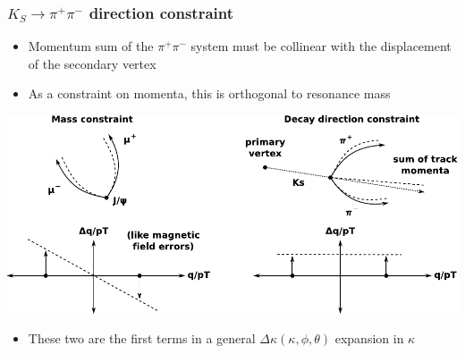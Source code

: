 \documentclass[compress]{beamer}
\begin{document}
\begin{frame}
\frametitle{$K_S \to \pi^+\pi^-$ direction constraint}

\begin{itemize}
\item Momentum sum of the $\pi^+\pi^-$ system must be collinear with
  the displacement of the secondary vertex

\item As a constraint on momenta, this is orthogonal to resonance mass
\end{itemize}

\includegraphics[width=\linewidth]{diagram.pdf}

\begin{itemize}
\item These two are the first terms in a general $\Delta \kappa(\kappa, \phi, \theta)$ expansion in $\kappa$

\end{itemize}
\end{frame}
\end{document}

